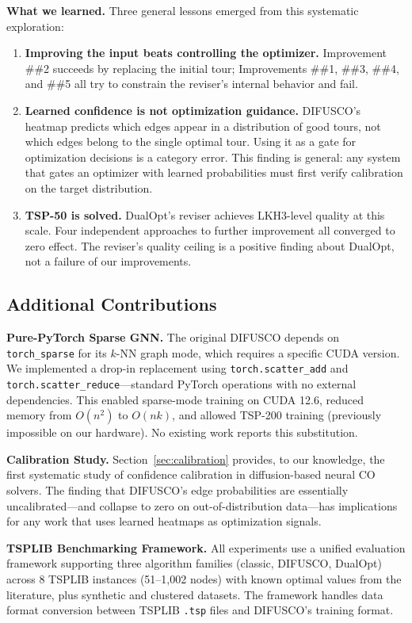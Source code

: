 \documentclass[11pt,a4paper]{article}
\begin{document}
\textbf{What we learned.} Three general lessons emerged from this systematic exploration:

\begin{enumerate}[nosep]
\item \textbf{Improving the input beats controlling the optimizer.} Improvement \#\#2 succeeds by replacing the initial tour; Improvements \#\#1, \#\#3, \#\#4, and \#\#5 all try to constrain the reviser's internal behavior and fail.
\item \textbf{Learned confidence is not optimization guidance.} DIFUSCO's heatmap predicts which edges appear in a distribution of good tours, not which edges belong to the single optimal tour. Using it as a gate for optimization decisions is a category error. This finding is general: any system that gates an optimizer with learned probabilities must first verify calibration on the target distribution.
\item \textbf{TSP-50 is solved.} DualOpt's reviser achieves LKH3-level quality at this scale. Four independent approaches to further improvement all converged to zero effect. The reviser's quality ceiling is a positive finding about DualOpt, not a failure of our improvements.
\end{enumerate}

\subsection{Additional Contributions}

\textbf{Pure-PyTorch Sparse GNN.} The original DIFUSCO depends on \texttt{torch\_sparse} for its $k$-NN graph mode, which requires a specific CUDA version. We implemented a drop-in replacement using \texttt{torch.scatter\_add} and \texttt{torch.scatter\_reduce}---standard PyTorch operations with no external dependencies. This enabled sparse-mode training on CUDA 12.6, reduced memory from $O(n^2)$ to $O(nk)$, and allowed TSP-200 training (previously impossible on our hardware). No existing work reports this substitution.

\textbf{Calibration Study.} Section~\ref{sec:calibration} provides, to our knowledge, the first systematic study of confidence calibration in diffusion-based neural CO solvers. The finding that DIFUSCO's edge probabilities are essentially uncalibrated---and collapse to zero on out-of-distribution data---has implications for any work that uses learned heatmaps as optimization signals.

\textbf{TSPLIB Benchmarking Framework.} All experiments use a unified evaluation framework supporting three algorithm families (classic, DIFUSCO, DualOpt) across 8 TSPLIB instances (51--1,002 nodes) with known optimal values from the literature, plus synthetic and clustered datasets. The framework handles data format conversion between TSPLIB \texttt{.tsp} files and DIFUSCO's training format.
\end{document}
